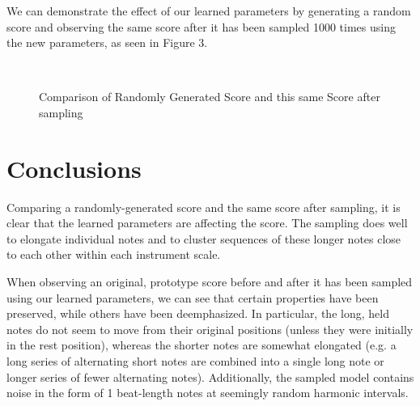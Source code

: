 \documentclass{article}
\begin{document}
We can demonstrate the effect of our learned parameters by generating a random score and observing the same score after it has been sampled 1000 times using the new parameters, as seen in Figure 3.

\begin{figure}
\centering
\mbox{
\quad
{}
}
\centering
\caption{Comparison of Randomly Generated Score and this same Score after sampling}
\label{fig-all}
\end{figure}


\section{Conclusions}
Comparing a randomly-generated score and the same score after sampling, it is clear that the learned parameters are affecting the score.  The sampling does well to elongate individual notes and to cluster sequences of these longer notes close to each other within each instrument scale.

When observing an original, prototype score before and after it has been sampled using our learned parameters, we can see that certain properties have been preserved, while others have been deemphasized.  In particular, the long, held notes do not seem to move from their original positions (unless they were initially in the rest position), whereas the shorter notes are somewhat elongated (e.g. a long series of alternating short notes are combined into a single long note or longer series of fewer alternating notes).  Additionally, the sampled model contains noise in the form of 1 beat-length notes at seemingly random harmonic intervals.
\end{document}
